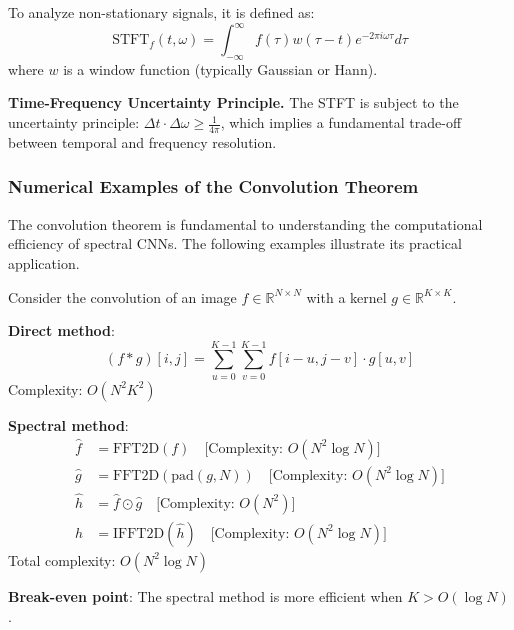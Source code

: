 \begin{definition}\label{def:stft}
To analyze non-stationary signals, it is defined as:
\begin{equation}
\text{STFT}_f(t, \omega) = \int_{-\infty}^{\infty} f(\tau) w(\tau - t) e^{-2\pi i \omega \tau} d\tau
\end{equation}
where $w$ is a window function (typically Gaussian or Hann).
\end{definition}

\textbf{Time-Frequency Uncertainty Principle.} The STFT is subject to the uncertainty principle: $\Delta t \cdot \Delta \omega \geq \frac{1}{4\pi}$, which implies a fundamental trade-off between temporal and frequency resolution.

\subsubsection{Numerical Examples of the Convolution Theorem}

The convolution theorem is fundamental to understanding the computational efficiency of spectral CNNs. The following examples illustrate its practical application.

\begin{example}\label{ex:convolution_fft_complexity}
Consider the convolution of an image $f \in \mathbb{R}^{N \times N}$ with a kernel $g \in \mathbb{R}^{K \times K}$.

\textbf{Direct method}:
\begin{equation}
(f * g)[i,j] = \sum_{u=0}^{K-1} \sum_{v=0}^{K-1} f[i-u, j-v] \cdot g[u,v]
\end{equation}
Complexity: $O(N^2 K^2)$

\textbf{Spectral method}:
\begin{align}
\hat{f} &= \text{FFT2D}(f) \quad \text{[Complexity: } O(N^2 \log N)\text{]} \\
\hat{g} &= \text{FFT2D}(\text{pad}(g, N)) \quad \text{[Complexity: } O(N^2 \log N)\text{]} \\
\hat{h} &= \hat{f} \odot \hat{g} \quad \text{[Complexity: } O(N^2)\text{]} \\
h &= \text{IFFT2D}(\hat{h}) \quad \text{[Complexity: } O(N^2 \log N)\text{]}
\end{align}
Total complexity: $O(N^2 \log N)$

\textbf{Break-even point}: The spectral method is more efficient when $K > O(\log N)$.
\end{example}

